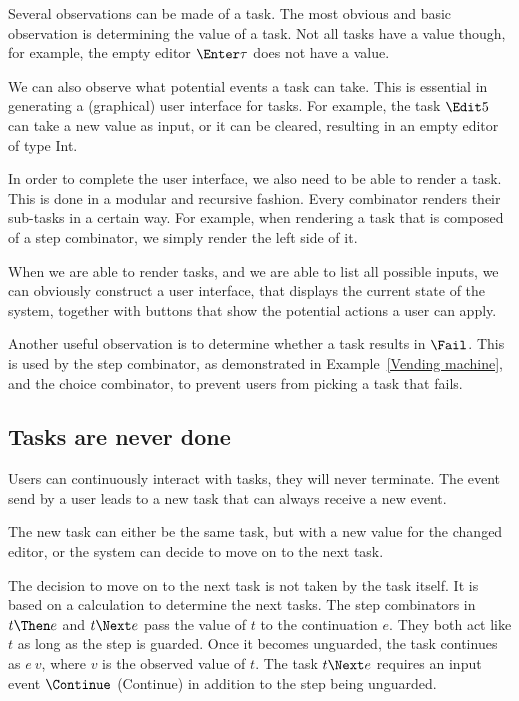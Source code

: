 Several observations can be made of a task. The most obvious and basic
observation is determining the value of a task. Not all tasks have a value
though, for example, the empty editor $\Enter \tau$ does not have a value.

We can also observe what potential events a task can take. This is essential in
generating a (graphical) user interface for tasks. For example, the task
$\Edit 5$ can take a new value as input, or it can be cleared, resulting in an
empty editor of type Int.

In order to complete the user interface, we also need to be able to render a
task. This is done in a modular and recursive fashion. Every combinator renders
their sub-tasks in a certain way. For example, when rendering a task that is
composed of a step combinator, we simply render the left side of it.

When we are able to render tasks, and we are able to list all possible inputs,
we can obviously construct a user interface, that displays the current state of
the system, together with buttons that show the potential actions a user can
apply.

Another useful observation is to determine whether a task results in $\Fail$.
This is used by the step combinator, as demonstrated in
Example~\ref{Vending machine}, and the choice combinator, to prevent users from
picking a task that fails.


\subsection{Tasks are never done}

Users can continuously interact with tasks, they will never terminate. The event
send by a user leads to a new task that can always receive a new event.

The new task can either be the same task, but with a new value for the changed
editor, or the system can decide to move on to the next task.

The decision to move on to the next task is not taken by the task itself.
It is based on a calculation to determine the next tasks.
The step combinators in $t \Then e$ and $t \Next e$ pass the value of $t$ to the continuation $e$.
They both act like $t$ as long as the step is guarded.
Once it becomes unguarded, the task continues as $e\ v$, where $v$ is the observed value of $t$.
The task $t \Next e$ requires an input event $\Continue$ (Continue) in addition to the step being unguarded. %


